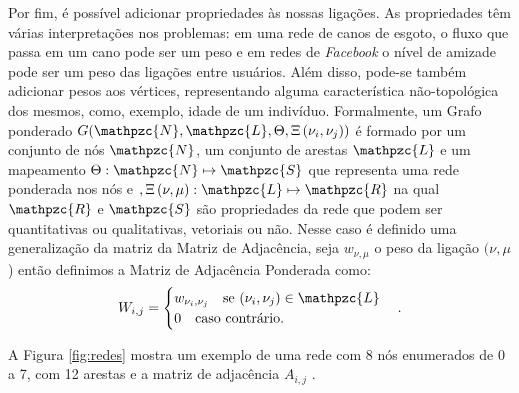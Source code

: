 Por fim, é possível adicionar propriedades às nossas ligações. As propriedades têm várias interpretações nos problemas: em uma rede de canos de esgoto, o fluxo que passa em um cano pode ser um peso e em redes de \textit{Facebook} o nível de amizade pode ser um peso das ligações entre usuários. 
Além disso, pode-se também adicionar pesos aos vértices, representando alguma característica não-topológica dos mesmos, como, exemplo, idade de um indivíduo.
Formalmente, um Grafo ponderado $G(\mathpzc{N},\mathpzc{L},\Theta,\Xi\left(\nu_i,\nu_j\right))$ é formado por um conjunto de nós $\mathpzc{N}$, um conjunto de arestas $\mathpzc{L}$ e um mapeamento $\Theta: \mathpzc{N}\mapsto \mathpzc{S}$ que representa uma rede ponderada nos nós e 
$,\Xi\left( \nu,\mu \right): \mathpzc{L}\mapsto \mathpzc{R}$ na qual $\mathpzc{R}$ e $\mathpzc{S}$ são propriedades da rede que podem ser quantitativas ou qualitativas, vetoriais ou não. Nesse caso é definido uma generalização da matriz da Matriz de Adjacência, seja 
$w_{\nu,\mu}$ o peso da ligação $(\nu,\mu$) então definimos a Matriz de Adjacência Ponderada como:
\[   
  W_{i,j} = 
     \begin{cases}
       w_{\nu_i,\nu_j} \quad 
       \text{se } (\nu_i,\nu_j)\in \mathpzc{L}\\
       0 \quad \text{caso contrário.} \\
     \end{cases}.
\]

A Figura \ref{fig:redes} mostra um exemplo 
de uma rede com 8 nós enumerados de 0 a 7, com 12 arestas e a matriz de adjacência $A_{i,j}$ .

